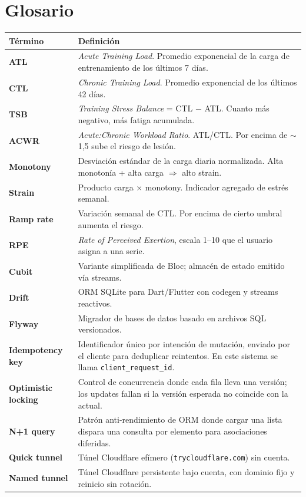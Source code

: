 \documentclass[11pt,a4paper]{article}
\begin{document}
\section{Glosario}

\begin{longtable}{p{} p{}}
\toprule
\textbf{Término} & \textbf{Definición} \\
\midrule
\endhead
\textbf{ATL} & \textit{Acute Training Load}. Promedio exponencial de la carga de entrenamiento de los últimos 7 días. \\
\textbf{CTL} & \textit{Chronic Training Load}. Promedio exponencial de los últimos 42 días. \\
\textbf{TSB} & \textit{Training Stress Balance} = CTL $-$ ATL. Cuanto más negativo, más fatiga acumulada. \\
\textbf{ACWR} & \textit{Acute:Chronic Workload Ratio}. ATL/CTL. Por encima de $\sim$1{,}5 sube el riesgo de lesión. \\
\textbf{Monotony} & Desviación estándar de la carga diaria normalizada. Alta monotonía + alta carga $\Rightarrow$ alto strain. \\
\textbf{Strain} & Producto carga $\times$ monotony. Indicador agregado de estrés semanal. \\
\textbf{Ramp rate} & Variación semanal de CTL. Por encima de cierto umbral aumenta el riesgo. \\
\textbf{RPE} & \textit{Rate of Perceived Exertion}, escala 1–10 que el usuario asigna a una serie. \\
\textbf{Cubit} & Variante simplificada de Bloc; almacén de estado emitido vía streams. \\
\textbf{Drift} & ORM SQLite para Dart/Flutter con codegen y streams reactivos. \\
\textbf{Flyway} & Migrador de bases de datos basado en archivos SQL versionados. \\
\textbf{Idempotency key} & Identificador único por intención de mutación, enviado por el cliente para deduplicar reintentos. En este sistema se llama \texttt{client\_request\_id}. \\
\textbf{Optimistic locking} & Control de concurrencia donde cada fila lleva una versión; los updates fallan si la versión esperada no coincide con la actual. \\
\textbf{N+1 query} & Patrón anti-rendimiento de ORM donde cargar una lista dispara una consulta por elemento para asociaciones diferidas. \\
\textbf{Quick tunnel} & Túnel Cloudflare efímero (\texttt{trycloudflare.com}) sin cuenta. \\
\textbf{Named tunnel} & Túnel Cloudflare persistente bajo cuenta, con dominio fijo y reinicio sin rotación. \\
\bottomrule
\end{longtable}
\end{document}
